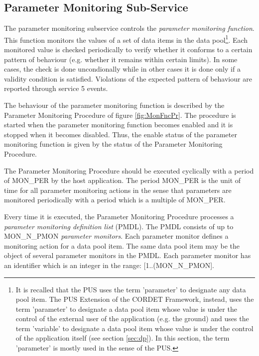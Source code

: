 \documentclass{pnp_article}
\begin{document}
\subsection{Parameter Monitoring Sub-Service}
The parameter monitoring subservice controls the \textit{parameter monitoring function}. This function monitors the values of a set of data items in the data pool\footnote{It is recalled that the PUS uses the term 'parameter' to designate any data pool item. The PUS Extension of the CORDET Framework, instead, uses the term 'parameter' to designate a data pool item whose value is under the control of the external user of the application (e.g. the ground) and uses the term 'variable' to designate a data pool item whose value is under the control of the application itself (see section \ref{sec:dp}). In this section, the term 'parameter' is mostly used in the sense of the PUS.}. Each monitored value is checked periodically to verify whether it conforms to a certain pattern of behaviour (e.g. whether it remains within certain limits). In some cases, the check is done uncondionally while in other cases it is done only if a validity condition is satisfied. Violations of the expected pattern of behaviour are reported through service 5 events. 

The behaviour of the parameter monitoring function is described by the Parameter Monitoring Procedure of figure \ref{fig:MonFncPr}. The procedure is started when the parameter monitoring function becomes enabled and it is stopped when it becomes disabled. Thus, the enable status of the parameter monitoring function is given by the status of the Parameter Monitoring Procedure.

The Parameter Monitoring Procedure should be executed cyclically with a period of MON\_PER by the host application. The period MON\_PER is the unit of time for all parameter monitoring actions in the sense that parameters are monitored periodically with a period which is a multiple of MON\_PER.

Every time it is executed, the Parameter Monitoring Procedure processes a \textit{parameter monitoring definition list} (PMDL). The PMDL consists of up to MON\_N\_PMON \textit{parameter monitors}. Each parameter monitor defines a monitoring action for a data pool item. The same data pool item may be the object of several parameter monitors in the PMDL. Each parameter monitor has an identifier which is an integer in the range: [1..(MON\_N\_PMON].
\end{document}
